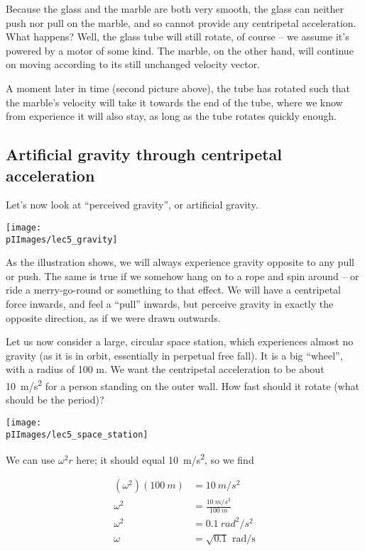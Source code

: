Because the glass and the marble are both very smooth, the glass can neither push nor pull on the marble, and so cannot provide any centripetal acceleration. What happens? Well, the glass tube will still rotate, of course -- we assume it's powered by a motor of some kind. The marble, on the other hand, will continue on moving according to its still unchanged velocity vector.

A moment later in time (second picture above), the tube has rotated such that the marble's velocity will take it towards the end of the tube, where we know from experience it will also stay, as long as the tube rotates quickly enough.

\subsection{Artificial gravity through centripetal acceleration}

Let's now look at ``perceived gravity'', or artificial gravity.

\begin{center}
\texttt{[image: \\pIImages/lec5\_gravity]}
\end{center}

As the illustration shows, we will always experience gravity opposite to any pull or push. The same is true if we somehow hang on to a rope and spin around -- or ride a merry-go-round or something to that effect. We will have a centripetal force inwards, and feel a ``pull'' inwards, but perceive gravity in exactly the opposite direction, as if we were drawn outwards.

Let us now consider a large, circular space station, which experiences almost no gravity (as it is in orbit, essentially in perpetual free fall). It is a big ``wheel'', with a radius of 100 m. We want the centripetal acceleration to be about \SI{10}{m/s^2} for a person standing on the outer wall. How fast should it rotate (what should be the period)?

\begin{center}
\texttt{[image: \\pIImages/lec5\_space\_station]}
\end{center}

We can use $\omega^2 r$ here; it should equal \SI{10}{m/s^2}, so we find

\begin{align}
(\omega^2)(\SI{100}{m}) &= \SI{10}{m/s^2}\\
\omega^2 &= \frac{\SI{10}{m/s^2}}{\SI{100}{m}}\\
\omega^2 &= \SI{0.1}{rad^2/s^2}\\
\omega &= \sqrt{0.1} \text{ rad/s}
\end{align}

